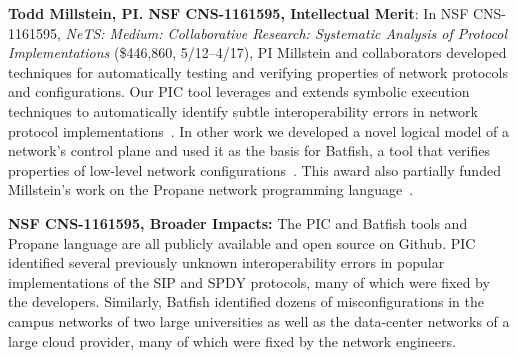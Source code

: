 \medskip
\noindent
{\bf Todd Millstein, PI. NSF CNS-1161595, Intellectual Merit}: In NSF CNS-1161595, {\em NeTS: Medium: Collaborative Research: Systematic Analysis of Protocol Implementations} (\$446,860, 5/12--4/17), PI Millstein and collaborators developed techniques for automatically testing and verifying properties of network protocols and configurations.  Our PIC tool leverages and extends symbolic execution techniques to automatically identify subtle interoperability errors in network protocol implementations~\cite{DBLP:conf/nsdi/PedrosaFKGMM15}.  In other work we developed a novel logical model of a network's control plane and used it as the basis for Batfish, a tool that verifies properties of low-level network configurations~\cite{batfish}.  This award also partially funded Millstein's work on the Propane network programming language~\cite{beckett+:propane}. 

\noindent
{\bf NSF CNS-1161595, Broader Impacts:} The PIC and Batfish tools and Propane language are all publicly available and open source on Github.  PIC identified several previously unknown interoperability errors in popular implementations of the SIP and SPDY protocols, many of which were fixed by the developers.  Similarly, Batfish identified dozens of misconfigurations in the campus networks of two large universities as well as the data-center networks of a large cloud provider, many of which were fixed by the network engineers.

